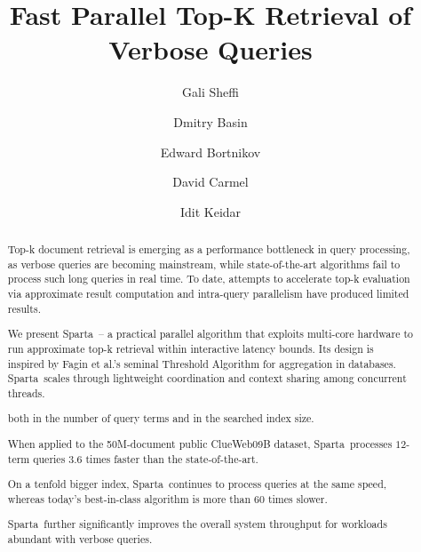 \documentclass[sigconf,review,anonymous]{acmart}
\title{Fast Parallel Top-K Retrieval of Verbose Queries}
\author{Gali Sheffi}%
\author{Dmitry Basin}%
\author{Edward Bortnikov}%
\author{David Carmel}%
\author{Idit Keidar}%
\newcommand{\alg}{Sparta}
\newcommand{\inred}[1]{{\color{red}{#1}}}
\newcommand{\bigdataset}[1]{#1} %
\begin{document}
\begin{abstract}

\inred{To do: generalize message to top-k beyond web search.}

Top-k document retrieval is emerging as a performance bottleneck in query processing, as verbose queries are becoming 
mainstream, while state-of-the-art algorithms fail to process such long queries in real time. To date, attempts to
accelerate top-k evaluation via approximate result computation and intra-query parallelism have produced limited results. 

We present \alg\ -- a practical parallel algorithm that exploits multi-core hardware to run approximate top-k retrieval 
within interactive latency bounds. Its design is inspired by  Fagin et al.'s seminal Threshold Algorithm for  aggregation in databases. 
\alg\ scales through lightweight coordination and context sharing among concurrent threads. 
\bigdataset{ 
both in the number of query terms and in the searched index size. 
}
When applied to the 50M-document public ClueWeb09B 
dataset, \alg\  processes $12$-term queries $3.6$ times faster than the state-of-the-art. 
\bigdataset{
On a tenfold  bigger index, 
\alg\ continues to process queries at the same speed, whereas today's best-in-class algorithm is more than 60 times slower. 
}
\alg\ further significantly improves the overall system throughput for workloads abundant with verbose queries.  
\end{abstract}


\maketitle








\clearpage

  
\end{document}
